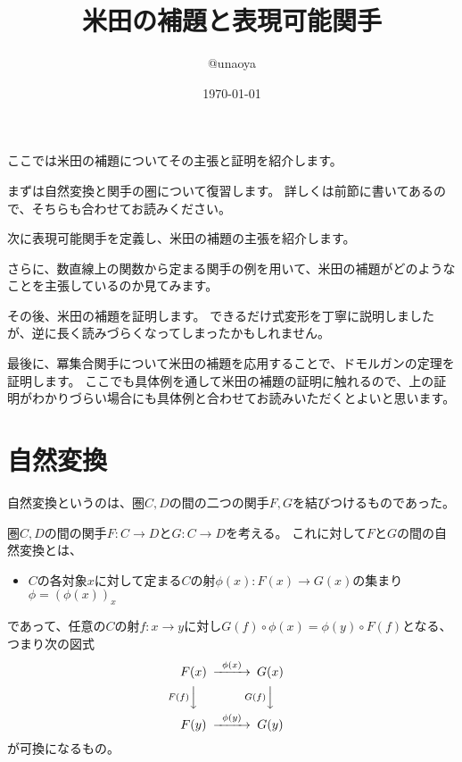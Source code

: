 \documentclass[uplatex]{jsarticle}
\title{米田の補題と表現可能関手}
\author{@unaoya}
\date{\today}
\begin{document}
\maketitle
ここでは米田の補題についてその主張と証明を紹介します。

まずは自然変換と関手の圏について復習します。
詳しくは前節に書いてあるので、そちらも合わせてお読みください。

次に表現可能関手を定義し、米田の補題の主張を紹介します。

さらに、数直線上の関数から定まる関手の例を用いて、米田の補題がどのようなことを主張しているのか見てみます。

その後、米田の補題を証明します。
できるだけ式変形を丁寧に説明しましたが、逆に長く読みづらくなってしまったかもしれません。

最後に、冪集合関手について米田の補題を応用することで、ドモルガンの定理を証明します。
ここでも具体例を通して米田の補題の証明に触れるので、上の証明がわかりづらい場合にも具体例と合わせてお読みいただくとよいと思います。

\section{自然変換}
自然変換というのは、圏$C, D$の間の二つの関手$F, G$を結びつけるものであった。

\begin{dfn}
圏$C, D$の間の関手$F:C \to D$と$G:C \to D$を考える。
これに対して$F$と$G$の間の自然変換とは、
\begin{itemize}
\item $C$の各対象$x$に対して定まる$C$の射$\phi(x):F(x)\to G(x)$の集まり$\phi=(\phi(x))_x$
\end{itemize}
であって、任意の$C$の射$f:x\to y$に対し$G(f)\circ\phi(x)=\phi(y)\circ F(f)$となる、つまり次の図式
\[
\begin{CD}
F(x)@>\phi(x)>>G(x)\\
@VF(f)VV@VG(f)VV\\
F(y)@>\phi(y)>>G(y)
\end{CD}
\]
が可換になるもの。
\end{dfn}
\end{document}
